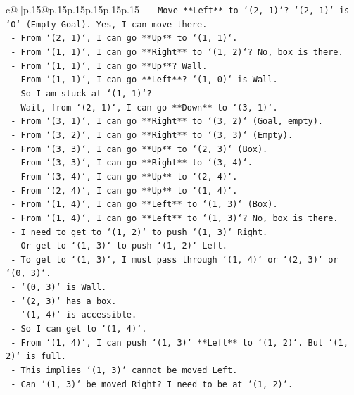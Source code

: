 \documentclass{article}
\begin{document}
{\begin{supertabular}{c@{$\;$}|p{.15\linewidth}@{}p{.15\linewidth}p{.15\linewidth}p{.15\linewidth}p{.15\linewidth}p{.15\linewidth}}
{{{\texttt{  {-} Move **Left** to `(2, 1)`? `(2, 1)` is `O` (Empty Goal). Yes, I can move there.} \\
\texttt{  {-} From `(2, 1)`, I can go **Up** to `(1, 1)`.} \\
\texttt{  {-} From `(1, 1)`, I can go **Right** to `(1, 2)`? No, box is there.} \\
\texttt{  {-} From `(1, 1)`, I can go **Up**? Wall.} \\
\texttt{  {-} From `(1, 1)`, I can go **Left**? `(1, 0)` is Wall.} \\
\texttt{  {-} So I am stuck at `(1, 1)`?} \\
\texttt{  {-} Wait, from `(2, 1)`, I can go **Down** to `(3, 1)`.} \\
\texttt{  {-} From `(3, 1)`, I can go **Right** to `(3, 2)` (Goal, empty).} \\
\texttt{  {-} From `(3, 2)`, I can go **Right** to `(3, 3)` (Empty).} \\
\texttt{  {-} From `(3, 3)`, I can go **Up** to `(2, 3)` (Box).} \\
\texttt{  {-} From `(3, 3)`, I can go **Right** to `(3, 4)`.} \\
\texttt{  {-} From `(3, 4)`, I can go **Up** to `(2, 4)`.} \\
\texttt{  {-} From `(2, 4)`, I can go **Up** to `(1, 4)`.} \\
\texttt{  {-} From `(1, 4)`, I can go **Left** to `(1, 3)` (Box).} \\
\texttt{  {-} From `(1, 4)`, I can go **Left** to `(1, 3)`? No, box is there.} \\
\texttt{  {-} I need to get to `(1, 2)` to push `(1, 3)` Right.} \\
\texttt{  {-} Or get to `(1, 3)` to push `(1, 2)` Left.} \\
\texttt{  {-} To get to `(1, 3)`, I must pass through `(1, 4)` or `(2, 3)` or `(0, 3)`.} \\
\texttt{  {-} `(0, 3)` is Wall.} \\
\texttt{  {-} `(2, 3)` has a box.} \\
\texttt{  {-} `(1, 4)` is accessible.} \\
\texttt{  {-} So I can get to `(1, 4)`.} \\
\texttt{  {-} From `(1, 4)`, I can push `(1, 3)` **Left** to `(1, 2)`. But `(1, 2)` is full.} \\
\texttt{  {-} This implies `(1, 3)` cannot be moved Left.} \\
\texttt{  {-} Can `(1, 3)` be moved Right? I need to be at `(1, 2)`.} \\
}}}
\end{supertabular}}
\end{document}
